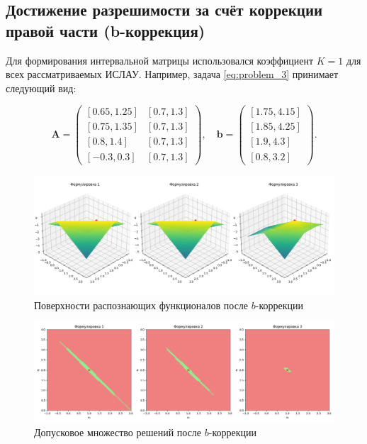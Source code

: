 \documentclass{article}
\begin{document}
\subsection{Достижение разрешимости за счёт коррекции правой части (b-коррекция)}

Для формирования интервальной матрицы использовался коэффициент \( K = 1 \) для всех рассматриваемых ИСЛАУ. Например, задача \ref{eq:problem_3} принимает следующий вид:

\[
\mathbf{A} = \begin{pmatrix}
  [0.65, 1.25] & [0.7, 1.3] \\
  [0.75, 1.35] & [0.7, 1.3] \\
  [0.8, 1.4] & [0.7, 1.3] \\
  [-0.3, 0.3] & [0.7, 1.3]
\end{pmatrix}, \quad
\mathbf{b} = \begin{pmatrix}
  [1.75, 4.15] \\
  [1.85, 4.25] \\
  [1.9, 4.3] \\
  [0.8, 3.2]
\end{pmatrix}.
\]

\begin{figure}[H]
  \centering
  \includegraphics[width=\textwidth]{tol_b_corrected}
  \caption{Поверхности распознающих функционалов после \( b \)-коррекции}
  \label{figure:tol_b_corrected}
\end{figure}

\begin{figure}[H]
  \centering
  \includegraphics[width=\textwidth]{tol_functional_b_corrected}
  \caption{Допусковое множество решений после \( b \)-коррекции}
  \label{figure:tol_functional_b_corrected}
\end{figure}
\end{document}
